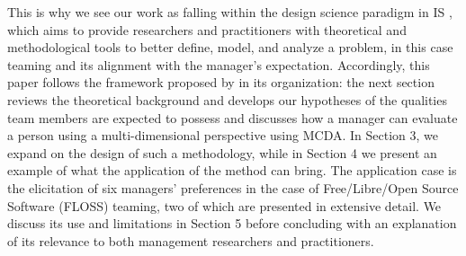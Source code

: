 This is why we see our work as falling within the design science paradigm in IS \citep{Vonetal04,MarchStorey08}, which aims to provide researchers and practitioners with theoretical and methodological tools to better define, model, and analyze a problem, in this case teaming and its alignment with the manager's expectation. Accordingly, this paper follows the framework proposed by \cite{GregorHevner13} in its organization: the next section reviews the theoretical background and develops our hypotheses of the qualities team members are expected to possess and discusses how a manager can evaluate a person using a multi-dimensional perspective using MCDA. In Section 3, we expand on the design of such a methodology, while in Section 4 we present an example of what the application of the method can bring. The application case is the elicitation of six managers' preferences in the case of Free/Libre/Open Source Software (FLOSS) teaming, two of which are presented in extensive detail. We discuss its use and limitations in Section 5 before concluding with an explanation of its relevance to both management researchers and practitioners.
